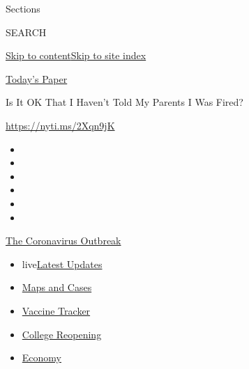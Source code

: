 Sections

SEARCH

\protect\hyperlink{site-content}{Skip to
content}\protect\hyperlink{site-index}{Skip to site index}

\href{https://myaccount.nytimes3xbfgragh.onion/auth/login?response_type=cookie\&client_id=vi}{}

\href{https://www.nytimes3xbfgragh.onion/section/todayspaper}{Today's
Paper}

Is It OK That I Haven't Told My Parents I Was Fired?

\url{https://nyti.ms/2Xqn9jK}

\begin{itemize}
\item
\item
\item
\item
\item
\item
\end{itemize}

\href{https://www.nytimes3xbfgragh.onion/news-event/coronavirus?action=click\&pgtype=Article\&state=default\&region=TOP_BANNER\&context=storylines_menu}{The
Coronavirus Outbreak}

\begin{itemize}
\tightlist
\item
  live\href{https://www.nytimes3xbfgragh.onion/2020/08/04/world/coronavirus-cases.html?action=click\&pgtype=Article\&state=default\&region=TOP_BANNER\&context=storylines_menu}{Latest
  Updates}
\item
  \href{https://www.nytimes3xbfgragh.onion/interactive/2020/us/coronavirus-us-cases.html?action=click\&pgtype=Article\&state=default\&region=TOP_BANNER\&context=storylines_menu}{Maps
  and Cases}
\item
  \href{https://www.nytimes3xbfgragh.onion/interactive/2020/science/coronavirus-vaccine-tracker.html?action=click\&pgtype=Article\&state=default\&region=TOP_BANNER\&context=storylines_menu}{Vaccine
  Tracker}
\item
  \href{https://www.nytimes3xbfgragh.onion/2020/08/02/us/covid-college-reopening.html?action=click\&pgtype=Article\&state=default\&region=TOP_BANNER\&context=storylines_menu}{College
  Reopening}
\item
  \href{https://www.nytimes3xbfgragh.onion/live/2020/08/04/business/stock-market-today-coronavirus?action=click\&pgtype=Article\&state=default\&region=TOP_BANNER\&context=storylines_menu}{Economy}
\end{itemize}

